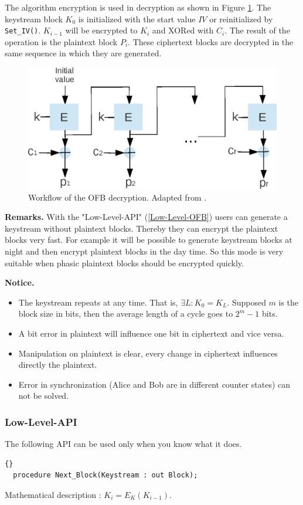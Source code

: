 The algorithm encryption is used in decryption as shown in Figure
\ref{OFBDE}. The keystream block $K_0$ is initialized with the start
value $IV$ or reinitialized by \texttt{Set\_IV()}. $K_{i-1}$ will be
encrypted to $K_i$ and XORed with $C_i$. The result of the operation
is the plaintext block $P_i$. These ciphertext blocks are decrypted in
the same sequence in which they are generated.
\begin{figure}[h]
\centering
\includegraphics[scale=0.8]{./images/OFB_De}
\caption{Workflow of the OFB decryption. Adapted from
  \cite{DBLP:reference/crypt/2011}.}\label{OFBDE}
\end{figure}

\noindent\textbf{Remarks.}
With the "Low-Level-API" (\ref{Low-Level-OFB}) users can generate a
keystream without plaintext blocks. Thereby they can encrypt the
plaintext blocks very fast. For example it will be possible to
generate keystream blocks at night and then encrypt plaintext blocks
in the day time. So this mode is very suitable when phasic plaintext
blocks should be encrypted quickly.

\noindent\textbf{Notice.}
\begin{itemize}
\item The keystream repeats at any time. That is, $\exists
  L:K_0=K_L$. Supposed $m$ is the block size in bits, then the average
  length of a cycle goes to $2^m-1$ bits.
\item A bit error in plaintext will influence one bit in ciphertext
  and vice versa.
\item Manipulation on plaintext is clear, every change in ciphertext
  influences directly the plaintext.
\item Error in synchronization (Alice and Bob are in different counter
  states) can not be solved.
\end{itemize}

\subsubsection*{Low-Level-API}\label{Low-Level-OFB}
The following API can be used only when you know what it does.
\begin{lstlisting}{}
  procedure Next_Block(Keystream : out Block);
\end{lstlisting}
Mathematical description : $K_i=E_K(K_{i-1})$.

